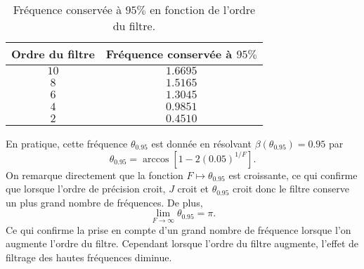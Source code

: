 \begin{table}
\begin{center}
\begin{tabular}{|c||c|}
\hline
\textbf{Ordre du filtre} & \textbf{Fréquence conservée à } $95\%$\\
\hline
\hline
$10$&$1.6695$\\
$8$&$1.5165$\\
$6$&$1.3045$\\
$4$&$0.9851$\\
$2$&$0.4510$\\
\hline
\end{tabular}
\end{center}
\caption{Fréquence conservée à $95\%$ en fonction de l'ordre du filtre.}
\label{tab:filter_095}
\end{table}

En pratique, cette fréquence $\theta_{0.95}$ est donnée en résolvant $\beta(\theta_{0.95})=0.95$ par 
\begin{equation}
\theta_{0.95} = \arccos \left[ 1-2 (0.05)^{1/F} \right].
\end{equation}
On remarque directement que la fonction $F \mapsto \theta_{0.95}$ est croissante, ce qui confirme que lorsque l'ordre de précision croit, $J$ croit et $\theta_{0.95}$ croit donc le filtre conserve un plus grand nombre de fréquences. De plus, 
\begin{equation}
\lim_{F \rightarrow \infty} \theta_{0.95} = \pi.
\end{equation}
Ce qui confirme la prise en compte d'un grand nombre de fréquence lorsque l'on augmente l'ordre du filtre. Cependant lorsque l'ordre du filtre augmente, l'effet de filtrage des hautes fréquences diminue.

